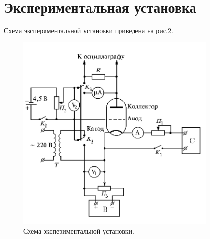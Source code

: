 \documentclass[a4paper,12pt]{article}
\begin{document}
	
\section{Экспериментальная установка} 
   
   
Схема экспериментальной установки приведена на рис.2.
  
    \begin{figure}[H]
  \begin{center}
    \includegraphics[width=10cm]{ex2.png}
    \caption{Схема экспериментальной установки.}
    \label{fig:}
  \end{center}
\end{figure}
 
\end{document}

